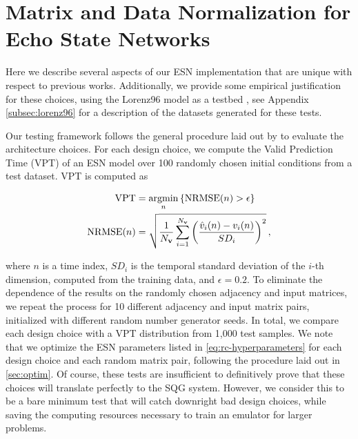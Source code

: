 \section{Matrix and Data Normalization for Echo State Networks}
\label{sec:new_methods}

Here we describe several aspects of our ESN implementation that are
unique with respect to previous works.
Additionally, we provide some empirical justification for these choices, using
the Lorenz96 model as a testbed \citep{lorenz_predictability_1996}, see
Appendix \cref{subsec:lorenz96} for a description of the datasets generated for these
tests.

Our testing framework follows the general procedure laid out
by \citet{platt_systematic_2022} to evaluate the architecture choices.
For each design choice, we compute the Valid Prediction Time (VPT) of
an ESN model over 100 randomly chosen initial conditions from a test dataset.
VPT is computed as
\begin{linenomath*}\begin{equation*}
    \begin{aligned}
        \text{VPT} &= \operatorname*{argmin}_{n} \left\{ \text{NRMSE}(n) > \epsilon \right\} \\
        \text{NRMSE}(n) &= \sqrt{\dfrac{1}{N_{\mathbf{v}}}\sum_{i=1}^{N_{\mathbf{v}}}\left(
            \dfrac{\hat{v}_i(n) - v_i(n)}{SD_i}
            \right)^2
        } \, ,
    \end{aligned}
\end{equation*}\end{linenomath*}
where $n$ is a time index, $SD_i$ is the temporal standard deviation of the $i$-th dimension,
computed from the training data, and $\epsilon=0.2$.
To eliminate the dependence of the results on the randomly chosen adjacency and
input matrices, we repeat the process for 10 different adjacency and input
matrix pairs, initialized with different random number generator seeds.
In total, we compare each design choice with a VPT distribution from 1,000 test samples.
We note that we optimize the ESN parameters listed in
\cref{eq:rc-hyperparameters} for each design choice and each random matrix pair,
following the procedure laid out in \cref{sec:optim}.
Of course, these tests are insufficient to definitively prove that these choices
will translate perfectly to the SQG system.
However, we consider this to be a bare minimum test that will catch downright bad
design choices, while saving the computing resources necessary to train an
emulator for larger problems.


